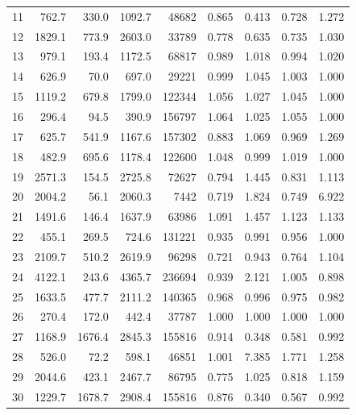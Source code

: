 \begin{center}
\begin{longtable}{@{}l@{\hspace{6pt}}rrrr@{\hspace{8pt}}rrrr@{}}
11 & 762.7 & 330.0 & 1092.7 & 48682 & 0.865 & 0.413 & 0.728 & 1.272 \\
12 & 1829.1 & 773.9 & 2603.0 & 33789 & 0.778 & 0.635 & 0.735 & 1.030 \\
13 & 979.1 & 193.4 & 1172.5 & 68817 & 0.989 & 1.018 & 0.994 & 1.020 \\
14 & 626.9 & 70.0 & 697.0 & 29221 & 0.999 & 1.045 & 1.003 & 1.000 \\
15 & 1119.2 & 679.8 & 1799.0 & 122344 & 1.056 & 1.027 & 1.045 & 1.000 \\
16 & 296.4 & 94.5 & 390.9 & 156797 & 1.064 & 1.025 & 1.055 & 1.000 \\
17 & 625.7 & 541.9 & 1167.6 & 157302 & 0.883 & 1.069 & 0.969 & 1.269 \\
18 & 482.9 & 695.6 & 1178.4 & 122600 & 1.048 & 0.999 & 1.019 & 1.000 \\
19 & 2571.3 & 154.5 & 2725.8 & 72627 & 0.794 & 1.445 & 0.831 & 1.113 \\
20 & 2004.2 & 56.1 & 2060.3 & 7442 & 0.719 & 1.824 & 0.749 & 6.922 \\
21 & 1491.6 & 146.4 & 1637.9 & 63986 & 1.091 & 1.457 & 1.123 & 1.133 \\
22 & 455.1 & 269.5 & 724.6 & 131221 & 0.935 & 0.991 & 0.956 & 1.000 \\
23 & 2109.7 & 510.2 & 2619.9 & 96298 & 0.721 & 0.943 & 0.764 & 1.104 \\
24 & 4122.1 & 243.6 & 4365.7 & 236694 & 0.939 & 2.121 & 1.005 & 0.898 \\
25 & 1633.5 & 477.7 & 2111.2 & 140365 & 0.968 & 0.996 & 0.975 & 0.982 \\
26 & 270.4 & 172.0 & 442.4 & 37787 & 1.000 & 1.000 & 1.000 & 1.000 \\
27 & 1168.9 & 1676.4 & 2845.3 & 155816 & 0.914 & 0.348 & 0.581 & 0.992 \\
28 & 526.0 & 72.2 & 598.1 & 46851 & 1.001 & 7.385 & 1.771 & 1.258 \\
29 & 2044.6 & 423.1 & 2467.7 & 86795 & 0.775 & 1.025 & 0.818 & 1.159 \\
30 & 1229.7 & 1678.7 & 2908.4 & 155816 & 0.876 & 0.340 & 0.567 & 0.992 \\
\end{longtable}
\end{center}

